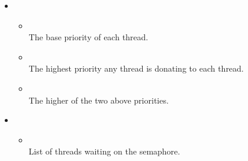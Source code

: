 \begin{itemize}

\item {} \begin{itemize}
		\item {}\\The base priority of each thread.
		\item {}\\The highest priority any thread is donating to each thread.
		\item {}\\The higher of the two above priorities.
\end{itemize}

\item {} \begin{itemize}
	\item {}\\List of threads waiting on the semaphore.
\end{itemize}

\end{itemize}

